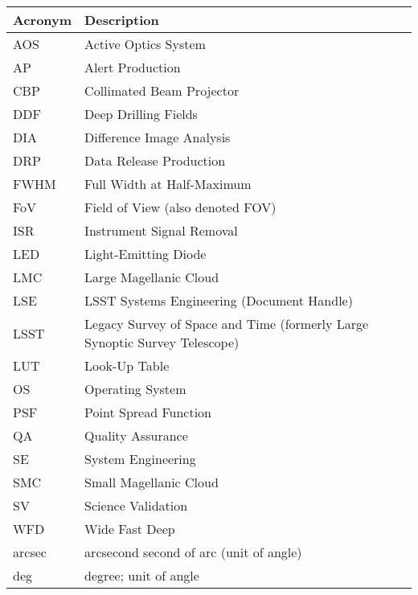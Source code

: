 \addtocounter{table}{-1}
\begin{longtable}{p{}p{}}\hline
\textbf{Acronym} & \textbf{Description}  \\\hline

AOS & Active Optics System \\\hline
AP & Alert Production \\\hline
CBP & Collimated Beam Projector \\\hline
DDF & Deep Drilling Fields \\\hline
DIA & Difference Image Analysis \\\hline
DRP & Data Release Production \\\hline
FWHM & Full Width at Half-Maximum \\\hline
FoV & Field of View (also denoted FOV) \\\hline
ISR & Instrument Signal Removal \\\hline
LED & Light-Emitting Diode \\\hline
LMC & Large Magellanic Cloud \\\hline
LSE & LSST Systems Engineering (Document Handle) \\\hline
LSST & Legacy Survey of Space and Time (formerly Large Synoptic Survey Telescope) \\\hline
LUT & Look-Up Table \\\hline
OS & Operating System \\\hline
PSF & Point Spread Function \\\hline
QA & Quality Assurance \\\hline
SE & System Engineering \\\hline
SMC & Small Magellanic Cloud \\\hline
SV & Science Validation \\\hline
WFD & Wide Fast Deep \\\hline
arcsec & arcsecond second of arc (unit of angle) \\\hline
deg & degree; unit of angle \\\hline
\end{longtable}
